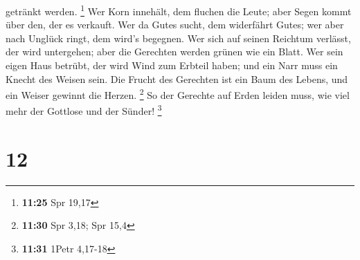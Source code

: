 getränkt werden. \footnote{\textbf{11:25} Spr 19,17}  Wer
Korn innehält, dem fluchen die Leute; aber Segen kommt über den, der es
verkauft.  Wer da Gutes sucht, dem widerfährt Gutes; wer
aber nach Unglück ringt, dem wird's begegnen.  Wer sich
auf seinen Reichtum verlässt, der wird untergehen; aber die Gerechten
werden grünen wie ein Blatt.  Wer sein eigen Haus
betrübt, der wird Wind zum Erbteil haben; und ein Narr muss ein Knecht
des Weisen sein.  Die Frucht des Gerechten ist ein Baum
des Lebens, und ein Weiser gewinnt die Herzen. \footnote{\textbf{11:30}
  Spr 3,18; Spr 15,4}  So der Gerechte auf Erden leiden
muss, wie viel mehr der Gottlose und der Sünder! \footnote{\textbf{11:31}
  1Petr 4,17-18}

\hypertarget{section-4}{%
\section{12}\label{section-4}}

